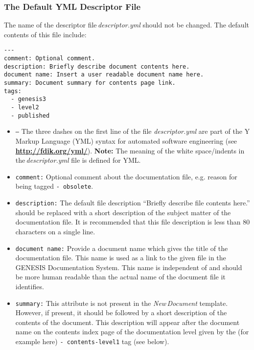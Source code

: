 \documentclass[12pt]{article}
\begin{document}
\subsubsection*{The Default YML Descriptor File}

The name of the descriptor file\,{\it descriptor.yml} should not be changed. The default contents of this file include:

\begin{verbatim}
---
comment: Optional comment.
description: Briefly describe document contents here. 
document name: Insert a user readable document name here.
summary: Document summary for contents page link. 
tags:
  - genesis3
  - level2
  - published
\end{verbatim}

\begin{itemize}

\item {\tt ---} The three dashes on the first line of the file {\it descriptor.yml} are part of the Y Markup Language (YML) syntax for automated software engineering (see \href{http://fdik.org/yml/}{\bf http://fdik.org/yml/}). {\bf Note:} The meaning of the white space/indents in the\,{\it descriptor.yml} file is defined for YML.

\item {\tt comment:} Optional comment about the documentation file, e.g. reason for being tagged {\tt -\,obsolete}.

\item {\tt description:} The default file description ``Briefly describe file contents here.'' should be replaced with a short description of the subject matter of the documentation file. It is recommended that this file description is less than 80 characters on a single line.

\item {\tt document name:} Provide a document name which gives the title of the documentation file. This name is used as a link to the given file in the GENESIS Documentation System. This name is independent of and should be more human readable than the actual name of the document file it identifies.

\item {\tt summary:} This attribute is not present in the {\it New\,Document} template. However, if present, it should be followed by a short description of the contents of the document. This description will appear after the document name on the contents index page of the documentation level given by the (for example here) {\tt -\,contents-level1} tag (see below).


\end{itemize}
\end{document}
